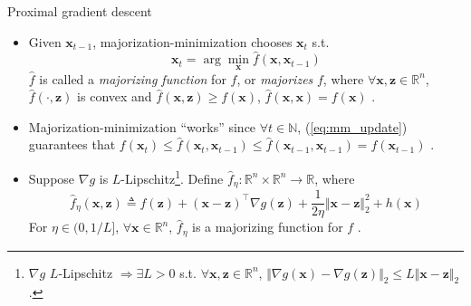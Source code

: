 \documentclass{beamer}
\numberwithin{equation}{section}
\newcommand{\aref}[1]{\alert{\ref{#1}}}
\begin{document}
\begin{frame}{Proximal gradient descent}
    \begin{itemize}
        \item
        Given $ \mathbf{x}_{t - 1} $, majorization-minimization chooses
        $ \mathbf{x}_t $ s.t. \cite{prox_algos}
        \begin{equation} \label{eq:mm_update}
            \mathbf{x}_t = \arg\min_\mathbf{x}\hat{f}(\mathbf{x},
            \mathbf{x}_{t - 1})
        \end{equation}
        $ \hat{f} $ is called a \textit{majorizing function} for $ f $, or
        \textit{majorizes} $ f $, where $ \forall \mathbf{x}, \mathbf{z} \in
        \mathbb{R}^n $, $ \hat{f}(\cdot, \mathbf{z}) $ is convex and
        $ \hat{f}(\mathbf{x}, \mathbf{z}) \ge f(\mathbf{x}) $,
        $ \hat{f}(\mathbf{x}, \mathbf{x}) = f(\mathbf{x}) $ \cite{prox_algos}.

        \item
        Majorization-minimization ``works'' since $ \forall t \in \mathbb{N} $,
        (\aref{eq:mm_update}) guarantees that $ f(\mathbf{x}_t) \le
        \hat{f}(\mathbf{x}_t, \mathbf{x}_{t - 1}) \le
        \hat{f}(\mathbf{x}_{t - 1}, \mathbf{x}_{t - 1}) =
        f(\mathbf{x}_{t - 1}) $ \cite{stat_learn_sparsity}.

        \item
        Suppose $ \nabla g $ is $ L $-Lipschitz\footnote{
            $ \nabla g $ $ L $-Lipschitz $ \Rightarrow \exists L > 0 $ s.t.
            $ \forall \mathbf{x}, \mathbf{z} \in \mathbb{R}^n $,
            $ \Vert\nabla g(\mathbf{x}) - \nabla g(\mathbf{z})\Vert_2 \le
            L\Vert\mathbf{x} - \mathbf{z}\Vert_2 $.
        }. Define $ \hat{f}_\eta : \mathbb{R}^n \times \mathbb{R}^n \rightarrow \mathbb{R} $, where
        \begin{equation} \label{eq:prox_grad_mm_func}
            \hat{f}_\eta(\mathbf{x}, \mathbf{z}) \triangleq f(\mathbf{z}) +
            (\mathbf{x} - \mathbf{z})^\top\nabla g(\mathbf{z}) +
            \frac{1}{2\eta}\Vert\mathbf{x} - \mathbf{z}\Vert_2^2 +
            h(\mathbf{x})
        \end{equation}
        For $ \eta \in (0, 1 / L] $, $ \forall \mathbf{x} \in \mathbb{R}^n $,
        $ \hat{f}_\eta $ is a majorizing function for $ f $ \cite{prox_algos}.
    \end{itemize}

    \medskip
\end{frame}
\end{document}
